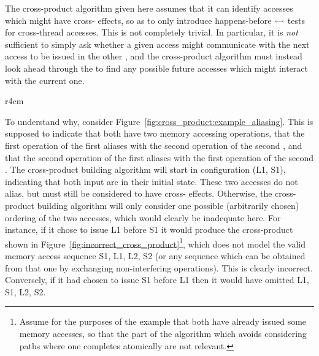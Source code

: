 
The cross-product algorithm given here assumes that it can identify
accesses which might have cross-{\StateMachine} effects, so as to only
introduce happens-before $\leftarrowtail$ tests for cross-thread
accesses.  This is not completely trivial.  In particular, it is
\emph{not} sufficient to simply ask whether a given access might
communicate with the next access to be issued in the other
{\StateMachine}, and the cross-product algorithm must instead look
ahead through the {\StateMachines} to find any possible future
accesses which might interact with the current one.

\begin{wrapfigure}{r}{4cm}
  \caption{An example aliasing and control flow graph. }
  \label{fig:cross_product:example_aliasing}
  \vspace{-10pt}
\end{wrapfigure}

To understand why, consider
Figure~\ref{fig:cross_product:example_aliasing}.  This is supposed to
indicate that both {\StateMachines} have two memory accessing
operations, that the first operation of the first {\StateMachine}
aliases with the second operation of the second {\StateMachine}, and
that the second operation of the first {\StateMachine} aliases with
the first operation of the second {\StateMachine}.  The cross-product
building algorithm will start in configuration (L1, S1), indicating
that both input {\StateMachines} are in their initial state.  These
two accesses do not alias, but must still be considered to have
cross-{\StateMachine} effects.  Otherwise, the cross-product building
algorithm will only consider one possible (arbitrarily chosen)
ordering of the two accesses, which would clearly be inadequate here.
For instance, if it chose to issue L1 before S1 it would produce the
cross-product {\StateMachine} shown in
Figure~\ref{fig:incorrect_cross_product}\footnote{Assume for the
  purposes of the example that both {\StateMachines} have already
  issued some memory accesses, so that the part of the algorithm which
  avoids considering paths where one {\StateMachine} completes
  atomically are not relevant.}, which does not model the valid memory
access sequence S1, L1, L2, S2 (or any sequence which can be obtained
from that one by exchanging non-interfering operations).  This is
clearly incorrect.  Conversely, if it had chosen to issue S1 before L1
then it would have omitted L1, S1, L2, S2.

